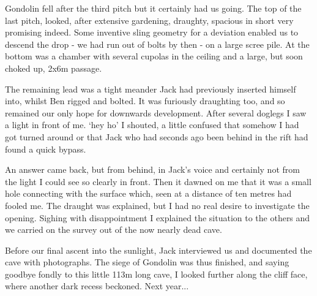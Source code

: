 \begin{figure*}[t!]
    \centering
    \caption{}
    \label{}
\end{figure*}

Gondolin fell after the third pitch but it certainly had us going. The top of the last pitch, looked, after extensive gardening, draughty, spacious in short very promising indeed. Some inventive sling geometry for a deviation enabled us to descend the drop - we had run out of bolts by then -  on a large scree pile.  At the bottom was a chamber with several cupolas in the ceiling and a large, but soon choked up, 2x6m passage. 

The remaining lead was a tight meander Jack had previously inserted himself into, whilst Ben rigged and bolted. It was furiously draughting too, and so remained our only hope for downwards development. After several doglegs I saw a light in front of me. ‘hey ho’ I shouted, a little confused that somehow I had got turned around or that Jack who had seconds ago been behind in the rift had found a quick bypass. 

An answer came back, but from behind, in Jack’s voice and certainly not from the light I could see so clearly in front. Then it dawned on me that it was a small hole connecting with the surface which, seen at a distance of ten metres had fooled me. The draught was explained, but I had no real desire to investigate the opening. Sighing with disappointment I explained the situation to the others and we carried on the survey out of the now nearly dead cave. 

Before our final ascent into the sunlight, Jack interviewed us and documented the cave with photographs. The siege of Gondolin was thus finished, and saying goodbye fondly to this little 113m long cave, I looked further along the cliff face, where another dark recess beckoned. Next year...

